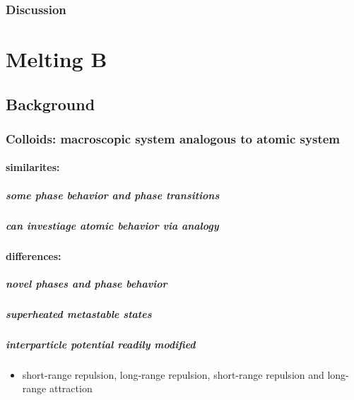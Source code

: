 \documentclass{umthesis}
\begin{document}
\subsection{Discussion}
\label{sec-1.3.7}
\chapter{Melting B}
\label{sec-2}
\section{Background}
\label{sec-2.1}
\subsection{Colloids: macroscopic system analogous to atomic system}
\label{sec-2.1.1}
\subsubsection{similarites:}
\label{sec-2.1.1.1}
\paragraph{some phase behavior and phase transitions}
\label{sec-2.1.1.1.1}
\paragraph{can investiage atomic behavior via analogy}
\label{sec-2.1.1.1.2}
\subsubsection{differences:}
\label{sec-2.1.1.2}
\paragraph{novel phases and phase behavior}
\label{sec-2.1.1.2.1}
\paragraph{superheated metastable states}
\label{sec-2.1.1.2.2}
\paragraph{interparticle potential readily modified}
\label{sec-2.1.1.2.3}
\begin{itemize}

\item short-range repulsion, long-range repulsion, short-range repulsion and long-range attraction\\
\label{sec-2.1.1.2.3.1}%
\end{itemize} %
\end{document}
